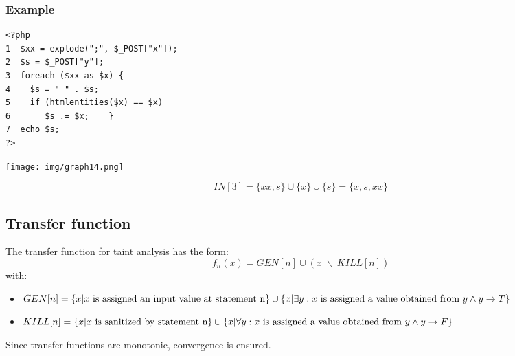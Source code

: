 \documentclass[a4paper, 10pt, titlepage]{article}
\begin{document}
\subsubsection*{Example}
\begin{minipage}{0.5\textwidth}
\begin{small}
\begin{lstlisting}
<?php 
1  $xx = explode(";", $_POST["x"]); 
2  $s = $_POST["y"]; 
3  foreach ($xx as $x) { 
4    $s = " " . $s; 
5    if (htmlentities($x) == $x) 
6       $s .= $x;    } 
7  echo $s; 
?>
\end{lstlisting}
\end{small}
\end{minipage}
\hfill\vline\hfill
\begin{minipage}{0.4\textwidth}
\begin{center}
\texttt{[image: img/graph14.png]}
\end{center}
\begin{small}
$$IN[3] = \{xx, s\} \cup \{x\} \cup \{s\} = \{x, s, xx\}$$
\end{small}
\end{minipage}

\subsection{Transfer function}
The transfer function for taint analysis has the form: 
$$f_n(x) = GEN[n] \cup (x \; \backslash \; KILL[n])$$
with:
\begin{itemize}
\item $GEN[n] = \{x | x \text{ is assigned an input value at statement n} \} \cup \\\{x | \exists y: x \text{ is assigned a value obtained from } y \wedge y \rightarrow T\}$
\item $KILL[n] = \{x | x \text{ is sanitized by statement n} \} \cup \\\{x | \forall y: x \text{ is assigned a value obtained from } y \wedge y \rightarrow F\}$
\end{itemize} 
Since transfer functions are monotonic, convergence is ensured.
\end{document}
